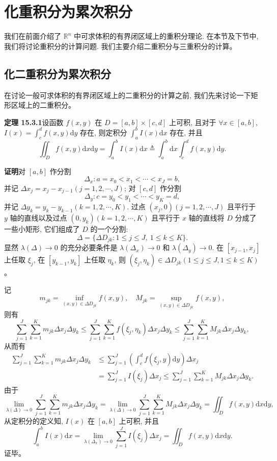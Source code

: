 \documentclass[UTF8,12pt,a4paper,fontset=fandol]{ctexart}
\begin{document}
\section{化重积分为累次积分}

我们在前面介绍了 $\mathbb R^n$ 中可求体积的有界闭区域上的重积分理论. 在本节及下节中, 我们将讨论重积分的计算问题. 我们主要介绍二重积分与三重积分的计算。

\subsection{化二重积分为累次积分}

在讨论一般可求体积的有界闭区域上的二重积分的计算之前, 我们先来讨论一下矩形区域上的二重积分。

\noindent\textbf{定理 15.3.1}\quad 设函数 $f(x,y)$ 在 $D=[a,b]\times[c,d]$ 上可积, 且对于 $\forall x\in[a,b]$, $I(x)=\int_c^d f(x,y)\mathrm dy$ 存在, 则定积分 $\int_a^b I(x)\mathrm dx$ 存在, 并且
\[
  \iint_D f(x,y)\mathrm dx\mathrm dy
  =\int_a^b I(x)\mathrm dx
  \triangleq\int_a^b\mathrm dx\int_c^d f(x,y)\mathrm dy.
\]

\noindent\textbf{证明}\quad 对 $[a,b]$ 作分割
\[
  \Delta_x:a=x_0<x_1<\cdots<x_J=b,
\]
并记 $\Delta x_j=x_j-x_{j-1}(j=1,2,\cdots,J)$; 对 $[c,d]$ 作分割
\[
  \Delta_y:c=y_0<y_1<\cdots<y_K=d,
\]
并记 $\Delta y_k=y_k-y_{k-1}(k=1,2,\cdots,K)$. 过点 $(x_j,0)(j=1,2,\cdots,J)$ 且平行于 $y$ 轴的直线以及过点 $(0,y_k)(k=1,2,\cdots,K)$ 且平行于 $x$ 轴的直线将 $D$ 分成了一些小矩形, 它们组成了 $D$ 的一个分割:
\[
  \Delta=\{\Delta D_{jk}:1\leqslant j\leqslant J,\ 1\leqslant k\leqslant K\}.
\]
显然 $\lambda(\Delta)\to0$ 的充分必要条件是 $\lambda(\Delta_x)\to0$ 和 $\lambda(\Delta_y)\to0$. 在 $[x_{j-1},x_j]$ 上任取 $\xi_j$, 在 $[y_{k-1},y_k]$ 上任取 $\eta_k$, 则 $(\xi_j,\eta_k)\in\Delta D_{jk}(1\leqslant j\leqslant J,1\leqslant k\leqslant K)$。

记
\[
  m_{jk}=\inf_{(x,y)\in\Delta D_{jk}}f(x,y),\quad
  M_{jk}=\sup_{(x,y)\in\Delta D_{jk}}f(x,y),
\]
则有
\[
  \sum_{j=1}^J\sum_{k=1}^K m_{jk}\Delta x_j\Delta y_k
  \leqslant \sum_{j=1}^J\sum_{k=1}^K f(\xi_j,\eta_k)\Delta x_j\Delta y_k
  \leqslant \sum_{j=1}^J\sum_{k=1}^K M_{jk}\Delta x_j\Delta y_k,
\]
从而有
\[
\begin{aligned}
  \sum_{j=1}^J\sum_{k=1}^K m_{jk}\Delta x_j\Delta y_k
  &\leqslant \sum_{j=1}^J\left(\int_c^d f(\xi_j,y)\mathrm dy\right)\Delta x_j\\
  &=\sum_{j=1}^J I(\xi_j)\Delta x_j
  \leqslant \sum_{j=1}^J\sum_{k=1}^K M_{jk}\Delta x_j\Delta y_k.
\end{aligned}
\]
由于
\[
  \lim_{\lambda(\Delta)\to0}\sum_{j=1}^J\sum_{k=1}^K m_{jk}\Delta x_j\Delta y_k
  =
  \lim_{\lambda(\Delta)\to0}\sum_{j=1}^J\sum_{k=1}^K M_{jk}\Delta x_j\Delta y_k
  =
  \iint_D f(x,y)\mathrm dx\mathrm dy,
\]
从定积分的定义知, $I(x)$ 在 $[a,b]$ 上可积, 并且
\[
  \int_a^b I(x)\mathrm dx
  =
  \lim_{\lambda(\Delta_x)\to0}\sum_{j=1}^J I(\xi_j)\Delta x_j
  =
  \iint_D f(x,y)\mathrm dx\mathrm dy.
\]
证毕。
\end{document}
